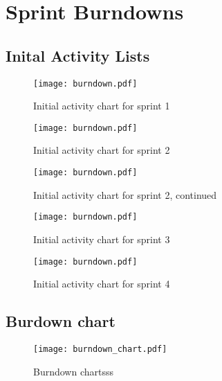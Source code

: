 \chapter{Sprint Burndowns}\label{appendix:burndown}

\section{Inital Activity Lists}

\begin{figure}[h!]
    \centering
	\texttt{[image: burndown.pdf]}
	\caption{Initial activity chart for sprint 1}
	\label{fig:old_website_design}
\end{figure}

\begin{figure}[h!]
    \centering
	\texttt{[image: burndown.pdf]}
	\caption{Initial activity chart for sprint 2}
	\label{fig:old_website_design}
\end{figure}

\begin{figure}[h!]
    \centering
	\texttt{[image: burndown.pdf]}
	\caption{Initial activity chart for sprint 2, continued}
	\label{fig:old_website_design}
\end{figure}

\begin{figure}[h!]
    \centering
	\texttt{[image: burndown.pdf]}
	\caption{Initial activity chart for sprint 3}
	\label{fig:old_website_design}
\end{figure}


\begin{figure}[h!]
    \centering
	\texttt{[image: burndown.pdf]}
	\caption{Initial activity chart for sprint 4}
	\label{fig:old_website_design}
\end{figure}

\newpage
\thispagestyle{empty}
\mbox{}

\newpage
\section{Burdown chart}
\begin{figure}[H]
    \centering
	\texttt{[image: burndown\_chart.pdf]}
	\caption{Burndown chartsss}
\end{figure}

\pagebreak
